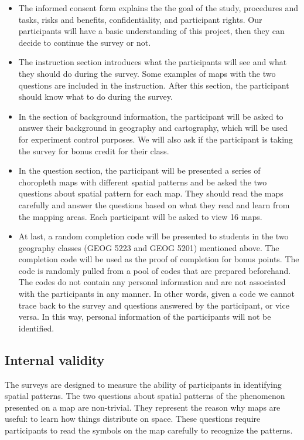 \begin{itemize}
    \item The informed consent form explains the the goal of the study, procedures and tasks, risks and benefits, confidentiality, and participant rights. Our participants will have a basic understanding of this project, then they can decide to continue the survey or not. 
    
    \item The instruction section introduces what the participants will see and what they should do during the survey. Some examples of maps with the two questions are included in the instruction. After this section, the participant should know what to do during the survey. 

    \item In the section of background information, the participant will be asked to answer their background in geography and cartography, which will be used for experiment control purposes. We will also ask if the participant is taking the survey for bonus credit for their class.

    \item In the question section, the participant will be presented a series of choropleth maps with different spatial patterns and be asked the two questions about spatial pattern for each map. They should read the maps carefully and answer the questions based on what they read and learn from the mapping areas. Each participant will be asked to view 16 maps.

    \item At last, a random completion code will be presented to students in the two geography classes (GEOG 5223 and GEOG 5201) mentioned above. The completion code will be used as the proof of completion for bonus points. The code is randomly pulled from a pool of codes that are prepared beforehand. The codes do not contain any personal information and are not associated with the participants in any manner. In other words, given a code we cannot trace back to the survey and questions answered by the participant, or vice versa. In this way, personal information of the participants will not be identified.
\end{itemize}

\subsection{Internal validity}

The surveys are designed to measure the ability of participants in identifying spatial patterns. The two questions about spatial patterns of the phenomenon presented on a map are non-trivial. They represent the reason why maps are useful: to learn how things distribute on space. These questions require participants to read the symbols on the map carefully to recognize the patterns. 

